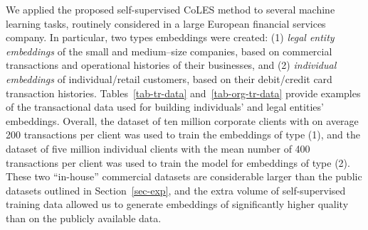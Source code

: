 \documentclass[sigconf, anonymous]{acmart}
\begin{document}
We applied the proposed self-supervised CoLES method to several machine learning tasks, routinely
considered in a large European financial services company.
% 
In particular, two types embeddings were created:
(1) \emph{legal entity embeddings} of the small and medium--size companies, based on commercial
transactions and operational histories of their businesses, and
(2) \emph{individual embeddings} of individual/retail customers, %
based on their debit/credit card transaction histories.
% 
Tables~\ref{tab-tr-data} and~\ref{tab-org-tr-data} provide examples of the transactional data
used for building individuals' and legal entities' embeddings. Overall, the dataset of ten
million corporate clients with on average 200 transactions per client was used to train the
embeddings of type (1), and the dataset of five million individual clients with the mean
number of 400 transactions per client was used to train the model for embeddings of type (2).
These two ``in-house'' commercial datasets are considerable larger than the public datasets
outlined in Section~\ref{sec-exp}, and the extra volume of self-supervised training data
allowed us to generate embeddings of significantly higher quality than on the publicly
available data.
\end{document}
